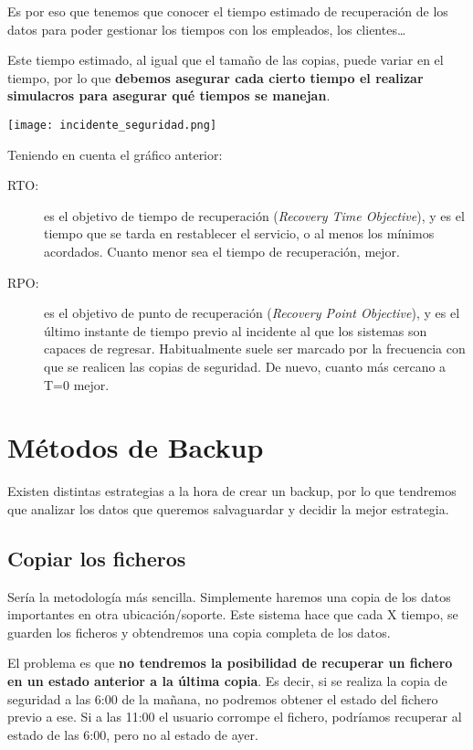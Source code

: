 
Es por eso que tenemos que conocer el tiempo estimado de recuperación de los datos para poder gestionar los tiempos con los empleados, los clientes…

Este tiempo estimado, al igual que el tamaño de las copias, puede variar en el tiempo, por lo que \textbf{debemos asegurar cada cierto tiempo el realizar simulacros para asegurar qué tiempos se manejan}.

\begin{center}
    \texttt{[image: incidente\_seguridad.png]}
\end{center}

Teniendo en cuenta el gráfico anterior:
\begin{description}
    \item[RTO:] es el objetivo de tiempo de recuperación (\textit{Recovery Time Objective}), y es el tiempo que se tarda en restablecer el servicio, o al menos los mínimos acordados. Cuanto menor sea el tiempo de recuperación, mejor.
    \item[RPO:] es el objetivo de punto de recuperación (\textit{Recovery Point Objective}), y es el último instante de tiempo previo al incidente al que los sistemas son capaces de regresar. Habitualmente suele ser marcado por la frecuencia con que se realicen las copias de seguridad. De nuevo, cuanto más cercano a T=0 mejor.
\end{description}

\section{Métodos de Backup}
Existen distintas estrategias a la hora de crear un backup, por lo que tendremos que analizar los datos que queremos salvaguardar y decidir la mejor estrategia.

\subsection{Copiar los ficheros}
Sería la metodología más sencilla. Simplemente haremos una copia de los datos importantes en otra ubicación/soporte. Este sistema hace que cada X tiempo, se guarden los ficheros y obtendremos una copia completa de los datos.

El problema es que \textbf{no tendremos la posibilidad de recuperar un fichero en un estado anterior a la última copia}. Es decir, si se realiza la copia de seguridad a las 6:00 de la mañana, no podremos obtener el estado del fichero previo a ese. Si a las 11:00 el usuario corrompe el fichero, podríamos recuperar al estado de las 6:00, pero no al estado de ayer.

